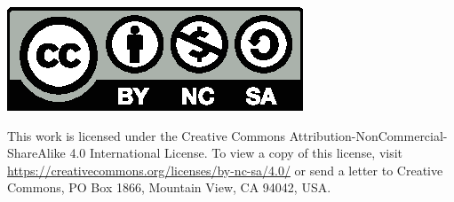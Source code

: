 \thispagestyle{empty}

\vspace*{0.4\textheight}

\begin{center}
  \includegraphics{misc/by-nc-sa}
\end{center}

\bigskip\noindent
This work is licensed under the Creative Commons Attribution-NonCommercial-ShareAlike 4.0 International License. To view a copy of this license, visit
\url{https://creativecommons.org/licenses/by-nc-sa/4.0/} or send a letter to
Creative Commons, PO Box 1866, Mountain View, CA 94042, USA.

\cleardoublepage